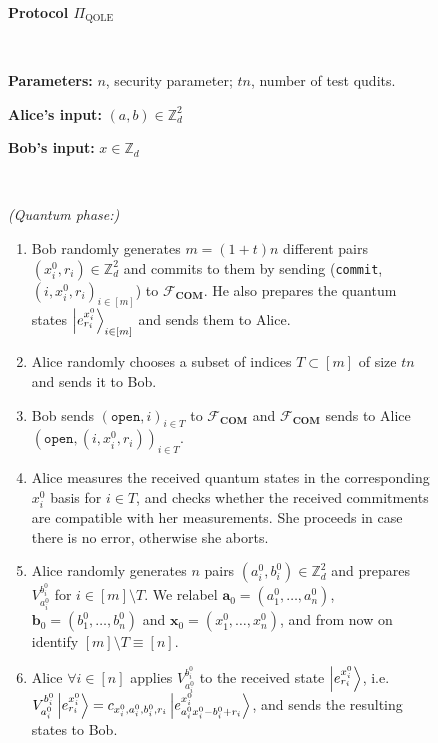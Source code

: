 \begin{figure}[h!]
    \centering
        \begin{tcolorbox}
            
            \centerline{\textbf{Protocol $\Pi_{\text{QOLE}}$}}
            
     \
            
    \footnotesize
    
    \textbf{Parameters:} $n$, security parameter; $tn$, number of test qudits.
    
    \textbf{Alice's input:} $(a, b)\in\mathbb{Z}_d^2$ 
    
    \textbf{Bob's input:} $x\in\mathbb{Z}_d$

\

    \textit{(Quantum phase:)}
    
    \begin{enumerate}
        \item Bob randomly generates $m = (1+t)n$ different pairs $(x^0_i, r_i)\in\mathbb{Z}_d^2$ and commits to them by sending (\texttt{commit}, $(i,x^0_i, r_i)_{ i\in [m]}$) to  $\mathcal{F}_{\textbf{COM}}$. He also prepares the quantum states $\ket{e^{x^0_i}_{r_i}}_{ i\in [m]}$ and sends them to Alice. 
        
        \item Alice randomly chooses a subset of indices $T\subset [m]$ of size $t n$ and sends it to Bob.
    
        \item Bob sends $(\texttt{open}, i)_{ i\in T}$ to $\mathcal{F}_{\textbf{COM}}$ and $\mathcal{F}_{\textbf{COM}}$ sends to Alice $(\texttt{open}, (i, x^0_i, r_i))_{ i\in T}$.
    
        \item Alice measures the received quantum states in the corresponding $x^0_i$ basis for $i\in T$, and checks whether the received commitments are compatible with her measurements. She proceeds in case there is no error, otherwise she aborts.
    
        \item Alice randomly generates $n$ pairs $(a^0_i, b^0_i)\in\mathbb{Z}_d^2$ and prepares  $V^{b^0_i}_{a^0_i}$ for $i\in [m]\setminus T$. We relabel $\bm{a}_0 = (a^0_1, \ldots, a^0_n)$, $\bm{b}_0 = (b^0_1, \ldots, b^0_n)$ and $\bm{x}_0 = (x^0_1, \ldots, x^0_n)$, and from now on identify $[m]\setminus T\equiv [n]$.
    
        \item Alice  $\forall i\in [n]$ applies $V^{b^0_i}_{a^0_i}$ to the received state $\ket{e^{x^0_i}_{r_i}}$, i.e. $V^{b^0_i}_{a^0_i} \ket{e^{x^0_i}_{r_i}} = c_{x^0_i,a^0_i,b^0_i,r_i} \ket{e^{x^0_i}_{a^0_i x^0_i - b^0_i + r_i}}$, and sends the resulting states to Bob.
    

\end{enumerate}
\end{tcolorbox}
\end{figure}
